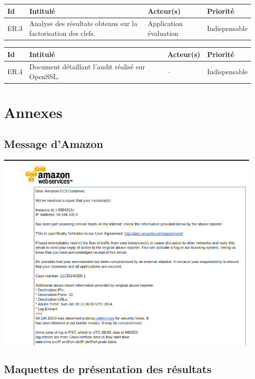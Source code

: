 \documentclass[a4paper,11pt,french]{article}
\begin{document}
\begin{center}
\begin{tabular}{|l|p{6cm}|p{6cm}|l|}
\hline
\textbf{Id} & \textbf{Intitulé} & \textbf{Acteur(s)} & \textbf{Priorité}\\
\hline
ER.3 & Analyse des résultats obtenus sur la factorisation des clefs. & Application évaluation & Indispensable \\
\hline
\end{tabular}
\end{center}

\begin{center}
\begin{tabular}{|l|p{6cm}|p{6cm}|l|}
\hline
\textbf{Id} & \textbf{Intitulé} & \textbf{Acteur(s)} & \textbf{Priorité}\\
\hline
ER.4 & Document détaillant l'audit réalisé sur OpenSSL. & -- & Indispensable \\
\hline
\end{tabular}
\end{center}


\section{Annexes}
\subsection{Message d'Amazon}
\begin{center}
\includegraphics[width=500px]{amazon_.png}
\end{center}

\subsection{Maquettes de présentation des résultats}
\end{document}
